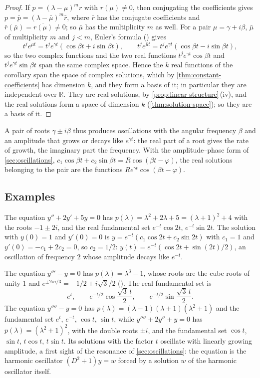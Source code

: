 \begin{proof}
If $p=(\lambda-\mu)^mr$ with $r(\mu)\ne0$, then conjugating the coefficients gives $p=\bar p=(\lambda-\bar\mu)^m\bar r$, where $\bar r$ has the conjugate coefficients and $\bar r(\bar\mu)=\overline{r(\mu)}\ne0$; so $\bar\mu$ has the multiplicity $m$ as well. For a pair $\mu=\gamma+i\beta$, $\bar\mu$ of multiplicity $m$ and $j<m$, Euler's formula () gives
\[
t^je^{\mu t}=t^je^{\gamma t}(\cos\beta t+i\sin\beta t),\qquad t^je^{\bar\mu t}=t^je^{\gamma t}(\cos\beta t-i\sin\beta t),
\]
so the two complex functions and the two real functions $t^je^{\gamma t}\cos\beta t$ and $t^je^{\gamma t}\sin\beta t$ span the same complex space. Hence the $k$ real functions of the corollary span the space of complex solutions, which by \cref{thm:constant-coefficients} has dimension $k$, and they form a basis of it; in particular they are independent over $\mathbb R$. They are real solutions, by \cref{prop:linear-structure}\,(iv), and the real solutions form a space of dimension $k$ (\cref{thm:solution-space}); so they are a basis of it.
\end{proof}

A pair of roots $\gamma\pm i\beta$ thus produces oscillations with the angular frequency $\beta$ and an amplitude that grows or decays like $e^{\gamma t}$: the real part of a root gives the rate of growth, the imaginary part the frequency. With the amplitude--phase form of \cref{sec:oscillations}, $c_1\cos\beta t+c_2\sin\beta t=R\cos(\beta t-\varphi)$, the real solutions belonging to the pair are the functions $Re^{\gamma t}\cos(\beta t-\varphi)$.

\subsection{Examples}

The equation $y''+2y'+5y=0$ has $p(\lambda)=\lambda^2+2\lambda+5=(\lambda+1)^2+4$ with the roots $-1\pm2i$, and the real fundamental set $e^{-t}\cos2t$, $e^{-t}\sin2t$. The solution with $y(0)=1$ and $y'(0)=0$ is $y=e^{-t}(c_1\cos2t+c_2\sin2t)$ with $c_1=1$ and $y'(0)=-c_1+2c_2=0$, so $c_2=1/2$: $y(t)=e^{-t}(\cos2t+\sin(2t)/2)$, an oscillation of frequency $2$ whose amplitude decays like $e^{-t}$.

The equation $y'''-y=0$ has $p(\lambda)=\lambda^3-1$, whose roots are the cube roots of unity $1$ and $e^{\pm2\pi i/3}=-1/2\pm i\sqrt3/2$ (). The real fundamental set is
\[
e^t,\qquad e^{-t/2}\cos\frac{\sqrt3\,t}2,\qquad e^{-t/2}\sin\frac{\sqrt3\,t}2 .
\]
The equation $y''''-y=0$ has $p(\lambda)=(\lambda-1)(\lambda+1)(\lambda^2+1)$ and the fundamental set $e^t$, $e^{-t}$, $\cos t$, $\sin t$, while $y''''+2y''+y=0$ has $p(\lambda)=(\lambda^2+1)^2$, with the double roots $\pm i$, and the fundamental set $\cos t$, $\sin t$, $t\cos t$, $t\sin t$. Its solutions with the factor $t$ oscillate with linearly growing amplitude, a first sight of the resonance of \cref{sec:oscillations}: the equation is the harmonic oscillator $(D^2+1)y=w$ forced by a solution $w$ of the harmonic oscillator itself.

